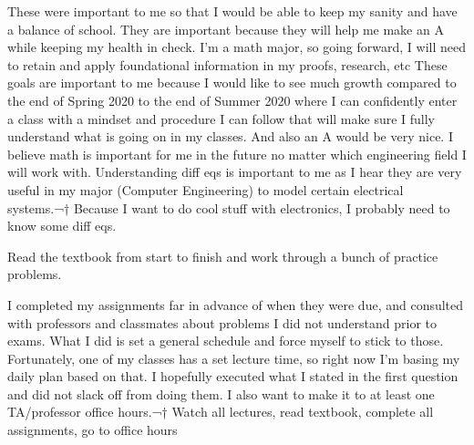 















These were important to me so that I would be able to keep my sanity and have a balance of school.
They are important because they will help me make an A while keeping my health in check.
I'm a math major, so going forward, I will need to retain and apply foundational information in my proofs, research, etc
These goals are important to me because I would like to see much growth compared to the end of Spring 2020 to the end of Summer 2020 where I can confidently enter a class with a mindset and procedure I can follow that will make sure I fully understand what is going on in my classes. And also an A would be very nice.
I believe math is important for me in the future no matter which engineering field I will work with.
Understanding diff eqs is important to me as I hear they are very useful in my major (Computer Engineering) to model certain electrical systems.¬† Because I want to do cool stuff with electronics, I probably need to know some diff eqs.






Read the textbook from start to finish and work through a bunch of practice problems.
























I completed my assignments far in advance of when they were due, and consulted with professors and classmates about problems I did not understand prior to exams.
What I did is set a general schedule and force myself to stick to those. Fortunately, one of my classes has a set lecture time, so right now I'm basing my daily plan based on that.
I hopefully executed what I stated in the first question and did not slack off from doing them. I also want to make it to at least one TA/professor office hours.¬†
Watch all lectures, read textbook, complete all assignments, go to office hours


